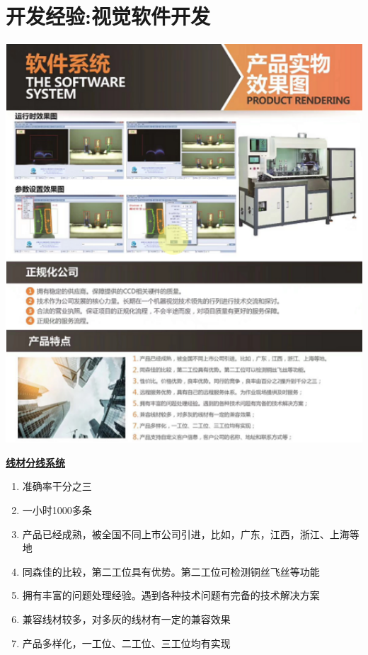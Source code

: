 \documentclass[lighthipster]{simplehipstercv}
\begin{document}
	\begin{minipage}[t]{\textwidth}
		\section*{开发经验:视觉软件开发}
		
		\begin{minipage}[t]{\textwidth}
			\begin{minipage}[thbp]{0.3\textwidth}
				\includegraphics[width=\linewidth]{PrjMy_1.png}
			\end{minipage} 
			\hfill
			\begin{minipage}[thbp]{0.6\textwidth}
				\textbf{\underline{线材分线系统}}
				\begin{enumerate}
					\item 准确率干分之三
					\item 一小时1000多条
					\item 产品已经成熟，被全国不同上市公司引进，比如，广东，江西，浙江、上海等地
					\item 同森佳的比较，第二工位具有优势。第二工位可检测铜丝飞丝等功能
					\item 拥有丰富的问题处理经验。遇到各种技术问题有完备的技术解决方案
					\item 兼容线材较多，对多灰的线材有一定的兼容效果
					\item 产品多样化，一工位、二工位、三工位均有实现
				\end{enumerate}
				

\end{minipage}
\end{minipage}
\end{minipage}
\end{document}
